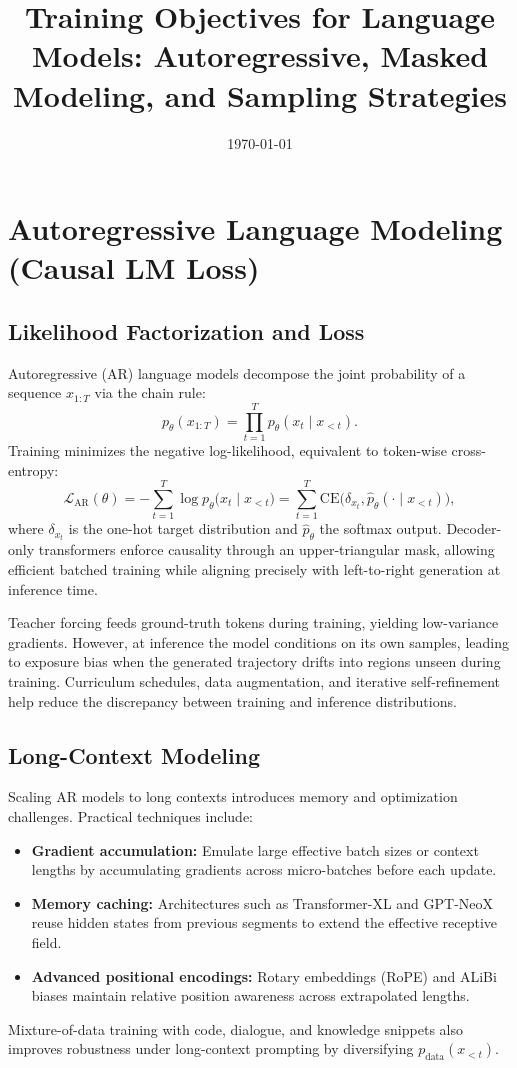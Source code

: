 \documentclass{article}
\title{Training Objectives for Language Models: Autoregressive, Masked Modeling, and Sampling Strategies}
\author{}
\date{\today}
\begin{document}
\maketitle

\section{Autoregressive Language Modeling (Causal LM Loss)}
\subsection{Likelihood Factorization and Loss}
Autoregressive (AR) language models decompose the joint probability of a sequence $x_{1:T}$ via the chain rule:
\begin{equation}
  p_\theta(x_{1:T}) = \prod_{t=1}^{T} p_\theta(x_t \mid x_{<t}).
\end{equation}
Training minimizes the negative log-likelihood, equivalent to token-wise cross-entropy:
\begin{equation}
  \mathcal{L}_{\text{AR}}(\theta) = - \sum_{t=1}^{T} \log p_\theta\big(x_t \mid x_{<t}\big) = \sum_{t=1}^{T} \mathrm{CE}\big(\delta_{x_t}, \hat{p}_\theta(\cdot \mid x_{<t})\big),
\end{equation}
where $\delta_{x_t}$ is the one-hot target distribution and $\hat{p}_\theta$ the softmax output. Decoder-only transformers enforce causality through an upper-triangular mask, allowing efficient batched training while aligning precisely with left-to-right generation at inference time.

Teacher forcing feeds ground-truth tokens during training, yielding low-variance gradients. However, at inference the model conditions on its own samples, leading to exposure bias when the generated trajectory drifts into regions unseen during training. Curriculum schedules, data augmentation, and iterative self-refinement help reduce the discrepancy between training and inference distributions.

\subsection{Long-Context Modeling}
Scaling AR models to long contexts introduces memory and optimization challenges. Practical techniques include:
\begin{itemize}
  \item \textbf{Gradient accumulation:} Emulate large effective batch sizes or context lengths by accumulating gradients across micro-batches before each update.
  \item \textbf{Memory caching:} Architectures such as Transformer-XL and GPT-NeoX reuse hidden states from previous segments to extend the effective receptive field.
  \item \textbf{Advanced positional encodings:} Rotary embeddings (RoPE) and ALiBi biases maintain relative position awareness across extrapolated lengths.
\end{itemize}
Mixture-of-data training with code, dialogue, and knowledge snippets also improves robustness under long-context prompting by diversifying $p_\mathrm{data}(x_{<t})$.
\end{document}
